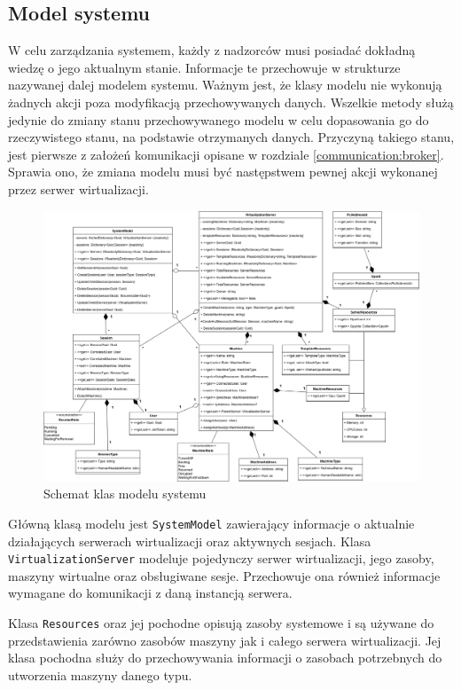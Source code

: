 \documentclass[../opis-rozwiazania.tex]{subfiles}
\begin{document}
\subsection{Model systemu}

W celu zarządzania systemem, każdy z nadzorców musi posiadać dokładną wiedzę o jego aktualnym stanie. Informacje te przechowuje w strukturze nazywanej dalej modelem systemu. Ważnym jest, że klasy modelu nie wykonują żadnych akcji poza modyfikacją przechowywanych danych. Wszelkie metody służą jedynie do zmiany stanu przechowywanego modelu w celu dopasowania go do rzeczywistego stanu, na podstawie otrzymanych danych. Przyczyną takiego stanu, jest pierwsze z założeń komunikacji opisane w rozdziale \ref{communication:broker}. Sprawia ono, że zmiana modelu musi być następstwem pewnej akcji wykonanej przez serwer wirtualizacji.

\begin{figure}[H]
    \centering
    \includegraphics[width=\textwidth]{../diagrams/class_diagrams/system_model_v2.png}
    \caption{Schemat klas modelu systemu}
\end{figure}

Główną klasą modelu jest \texttt{SystemModel} zawierający informacje o aktualnie działających serwerach wirtualizacji oraz aktywnych sesjach. Klasa \texttt{VirtualizationServer} modeluje pojedynczy serwer wirtualizacji, jego zasoby, maszyny wirtualne oraz obsługiwane sesje. Przechowuje ona również informacje wymagane do komunikacji z daną instancją serwera.

Klasa \texttt{Resources} oraz jej pochodne opisują zasoby systemowe i są używane do przedstawienia zarówno zasobów maszyny jak i całego serwera wirtualizacji. Jej klasa pochodna \texttt{} służy do przechowywania informacji o zasobach potrzebnych do utworzenia maszyny danego typu.
\end{document}
